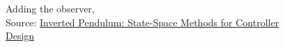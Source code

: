 \documentclass{article}
\begin{document}
\begin{figure}
\begin{minipage}[c]{0.45\textwidth}
\centering
{}
\end{minipage}
\begin{minipage}[c]{0.45\textwidth}
\end{minipage}
\caption{Adding the observer, \\ Source: \href{http://ctms.engin.umich.edu/CTMS/index.php?example=InvertedPendulum&section=ControlStateSpace}{Inverted Pendulum: State-Space Methods for Controller Design}}
\end{figure}
\end{document}

